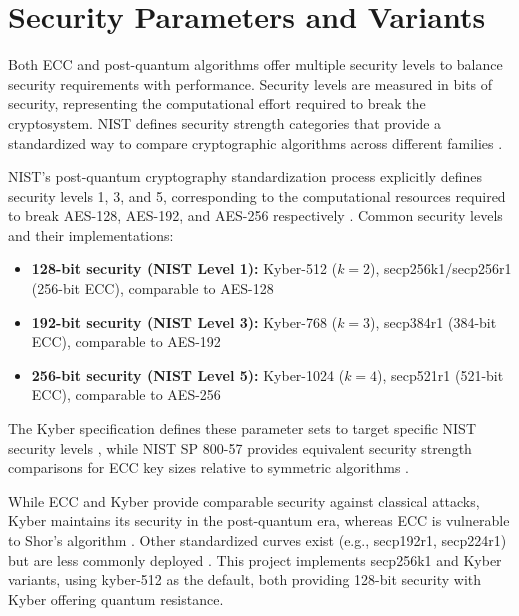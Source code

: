 \section{Security Parameters and Variants}

Both ECC and post-quantum algorithms offer multiple security levels to balance security requirements with performance. Security levels are measured in bits of security, representing the computational effort required to break the cryptosystem. NIST defines security strength categories that provide a standardized way to compare cryptographic algorithms across different families \cite{NISTSP800-57,NIST-PQC-Levels}.

NIST's post-quantum cryptography standardization process explicitly defines security levels 1, 3, and 5, corresponding to the computational resources required to break AES-128, AES-192, and AES-256 respectively \cite{NIST-PQC-Levels}. Common security levels and their implementations:
\begin{itemize}
\item \textbf{128-bit security (NIST Level 1):} Kyber-512 ($k=2$), secp256k1/secp256r1 (256-bit ECC), comparable to AES-128
\item \textbf{192-bit security (NIST Level 3):} Kyber-768 ($k=3$), secp384r1 (384-bit ECC), comparable to AES-192
\item \textbf{256-bit security (NIST Level 5):} Kyber-1024 ($k=4$), secp521r1 (521-bit ECC), comparable to AES-256
\end{itemize}

The Kyber specification defines these parameter sets to target specific NIST security levels \cite{Kyber-Spec}, while NIST SP 800-57 provides equivalent security strength comparisons for ECC key sizes relative to symmetric algorithms \cite{NISTSP800-57}.

While ECC and Kyber provide comparable security against classical attacks, Kyber maintains its security in the post-quantum era, whereas ECC is vulnerable to Shor's algorithm \cite{Shor1997}. Other standardized curves exist (e.g., secp192r1, secp224r1) but are less commonly deployed \cite{SEC1}. This project implements secp256k1 and Kyber variants, using kyber-512 as the default, both providing 128-bit security with Kyber offering quantum resistance.